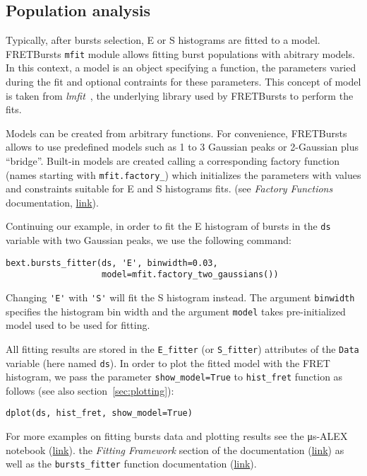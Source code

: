 \subsection{Population analysis}
\label{sec:fretfit}

Typically, after bursts selection, E or S histograms are fitted to a model.
FRETBursts \verb|mfit| module allows fitting burst populations 
with abitrary models. In this context, a model is an object 
specifying a function, the parameters varied during the fit
and optional contraints for these parameters. This concept of model
is taken from \textit{lmfit}~\cite{lmfit}, the underlying library used by
FRETBursts to perform the fits.

Models can be created from arbitrary functions. For convenience,
FRETBursts allows to use predefined models such as 1 to 3 Gaussian
peaks or 2-Gaussian plus ``bridge''.
Built-in models are created calling a corresponding factory function
(names starting with \verb|mfit.factory_|) which initializes the parameters
with values and constraints suitable for E and S histograms fits.
(see \textit{Factory Functions} documentation, 
\href{http://fretbursts.readthedocs.org/en/latest/mfit.html#model-factory-functions}{link}).

Continuing our example, in order to fit the E histogram of bursts in the
\verb|ds| variable with two Gaussian peaks, we use the following command:

\begin{lstlisting}
bext.bursts_fitter(ds, 'E', binwidth=0.03,
                   model=mfit.factory_two_gaussians())
\end{lstlisting}

Changing \verb|'E'| with \verb|'S'| will fit the S histogram instead.
The argument \verb|binwidth| specifies the histogram bin width and 
the argument \verb|model| takes pre-initialized model used to be used for
fitting.

All fitting results are stored in the \verb|E_fitter| (or \verb|S_fitter|)
attributes of the \verb|Data| variable (here named \verb|ds|).
In order to plot the fitted model with the FRET histogram, we pass the parameter
\verb|show_model=True| to \verb|hist_fret| function as follows
(see also section~\ref{sec:plotting}):

\begin{lstlisting}
dplot(ds, hist_fret, show_model=True)
\end{lstlisting}

For more examples on fitting bursts data and plotting results see the
μs-ALEX notebook (\href{http://nbviewer.jupyter.org/github/tritemio/FRETBursts_notebooks/blob/master/notebooks/FRETBursts%20-%20us-ALEX%20smFRET%20burst%20analysis.ipynb}{link}).
the \textit{Fitting Framework} section of the documentation 
(\href{http://fretbursts.readthedocs.org/en/latest/fit.html}{link})
as well as the \verb|bursts_fitter| function documentation
(\href{http://fretbursts.readthedocs.org/en/latest/plugins.html#fretbursts.burstlib\_ext.bursts\_fitter}{link}).

